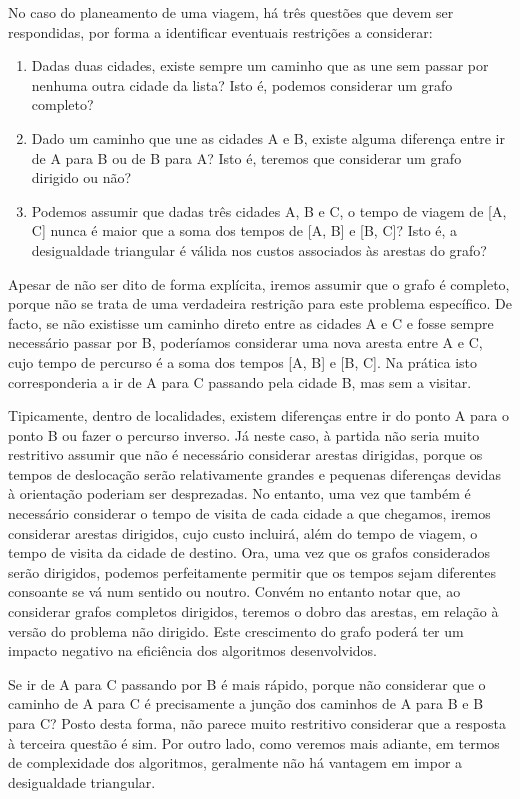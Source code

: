 \documentclass[12pt,a4paper,reqno]{report}
\numberwithin{figure}{section}
\numberwithin{equation}{section}
\numberwithin{figure}{section}
\numberwithin{equation}{section}
\begin{document}
No caso do planeamento de uma viagem, há três questões que devem ser respondidas, por forma a identificar eventuais restrições a considerar:
\begin{enumerate}
	\item Dadas duas cidades, existe sempre um caminho que as une sem passar por nenhuma outra cidade da lista? Isto é, podemos considerar um grafo completo?
	\item Dado um caminho que une as cidades A e B, existe alguma diferença entre ir de A para B ou de B para A? Isto é, teremos que considerar um grafo dirigido ou não?
	\item Podemos assumir que dadas três cidades A, B e C, o tempo de viagem de [A, C] nunca é maior que a soma dos tempos de [A, B] e [B, C]? Isto é, a desigualdade triangular é válida nos custos associados às arestas do grafo?
\end{enumerate}

Apesar de não ser dito de forma explícita, iremos assumir que o grafo é completo, porque não se trata de uma verdadeira restrição para este problema específico. De facto, se não existisse um caminho direto entre as cidades A e C e fosse sempre necessário passar por B, poderíamos considerar uma nova aresta entre A e C, cujo tempo de percurso é a soma dos tempos [A, B] e [B, C]. Na prática isto corresponderia a ir de A para C passando pela cidade B, mas sem a visitar.

Tipicamente, dentro de localidades, existem diferenças entre ir do ponto A para o ponto B ou fazer o percurso inverso. Já neste caso, à partida não seria muito restritivo assumir que não é necessário considerar arestas dirigidas, porque os tempos de deslocação serão relativamente grandes e pequenas diferenças devidas à orientação poderiam ser desprezadas. No entanto, uma vez que também é necessário considerar o tempo de visita de cada cidade a que chegamos, iremos considerar arestas dirigidos, cujo custo incluirá, além do tempo de viagem, o tempo de visita da cidade de destino. Ora, uma vez que os grafos considerados serão dirigidos, podemos perfeitamente permitir que os tempos sejam diferentes consoante se vá num sentido ou noutro. Convém no entanto notar que, ao considerar grafos completos dirigidos, teremos o dobro das arestas, em relação à versão do problema não dirigido. Este crescimento do grafo poderá ter um impacto negativo na eficiência dos algoritmos desenvolvidos.

Se ir de A para C passando por B é mais rápido, porque não considerar que o caminho de A para C é precisamente a junção dos caminhos de A para B e B para C? Posto desta forma, não parece muito restritivo considerar que a resposta à terceira questão é sim. Por outro lado, como veremos mais adiante, em termos de complexidade dos algoritmos, geralmente não há vantagem em impor a desigualdade triangular.
\end{document}
